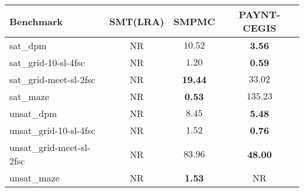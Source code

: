 \begin{tabular}{lccc}
\toprule
Benchmark & SMT(LRA) & SMPMC & PAYNT-CEGIS \\
\midrule
sat\_dpm & NR & $10.52$ & \textbf{3.56} \\
sat\_grid-10-sl-4fsc & NR & $1.20$ & \textbf{0.59} \\
sat\_grid-meet-sl-2fsc & NR & \textbf{19.44} & $33.02$ \\
sat\_maze & NR & \textbf{0.53} & $135.23$ \\
unsat\_dpm & NR & $8.45$ & \textbf{5.48} \\
unsat\_grid-10-sl-4fsc & NR & $1.52$ & \textbf{0.76} \\
unsat\_grid-meet-sl-2fsc & NR & $83.96$ & \textbf{48.00} \\
unsat\_maze & NR & \textbf{1.53} & NR \\
\bottomrule
\end{tabular}
